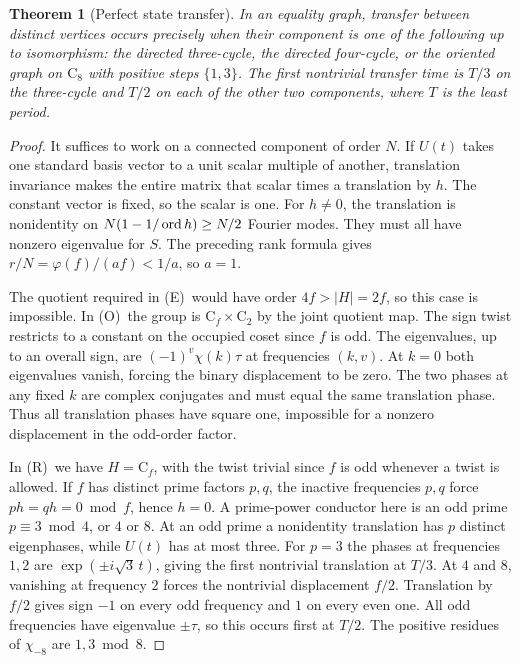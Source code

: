 \documentclass[11pt,letterpaper]{article}
\newtheorem{theorem}{Theorem}[section]
\newcommand{\Cyc}{\mathrm C}
\newcommand{\rr}{\textup{(R)}}\newcommand{\ooe}{\textup{(O)}}\newcommand{\ee}{\textup{(E)}}
\begin{document}
\begin{theorem}[Perfect state transfer]\label{th:pst}
In an equality graph, transfer between distinct vertices occurs precisely when their component is one of the following up to isomorphism: the directed three-cycle, the directed four-cycle, or the oriented graph on $\Cyc_8$ with positive steps $\{1,3\}$. The first nontrivial transfer time is $T/3$ on the three-cycle and $T/2$ on each of the other two components, where $T$ is the least period.
\end{theorem}
\begin{proof}
It suffices to work on a connected component of order $N$. If $U(t)$ takes one standard basis vector to a unit scalar multiple of another, translation invariance makes the entire matrix that scalar times a translation by $h$. The constant vector is fixed, so the scalar is one. For $h\ne0$, the translation is nonidentity on $N(1-1/\operatorname{ord} h)\ge N/2$ Fourier modes. They must all have nonzero eigenvalue for $S$. The preceding rank formula gives $r/N=\varphi(f)/(af)<1/a$, so $a=1$.

The quotient required in \ee\ would have order $4f>|H|=2f$, so this case is impossible. In \ooe\ the group is $\Cyc_f\times\Cyc_2$ by the joint quotient map. The sign twist restricts to a constant on the occupied coset since $f$ is odd. The eigenvalues, up to an overall sign, are $(-1)^v\chi(k)\tau$ at frequencies $(k,v)$. At $k=0$ both eigenvalues vanish, forcing the binary displacement to be zero. The two phases at any fixed $k$ are complex conjugates and must equal the same translation phase. Thus all translation phases have square one, impossible for a nonzero displacement in the odd-order factor.

In \rr\ we have $H=\Cyc_f$, with the twist trivial since $f$ is odd whenever a twist is allowed. If $f$ has distinct prime factors $p,q$, the inactive frequencies $p,q$ force $ph=qh=0\bmod f$, hence $h=0$. A prime-power conductor here is an odd prime $p\equiv3\bmod4$, or $4$ or $8$. At an odd prime a nonidentity translation has $p$ distinct eigenphases, while $U(t)$ has at most three. For $p=3$ the phases at frequencies $1,2$ are $\exp(\pm i\sqrt3\,t)$, giving the first nontrivial translation at $T/3$. At $4$ and $8$, vanishing at frequency $2$ forces the nontrivial displacement $f/2$. Translation by $f/2$ gives sign $-1$ on every odd frequency and $1$ on every even one. All odd frequencies have eigenvalue $\pm\tau$, so this occurs first at $T/2$. The positive residues of $\chi_{-8}$ are $1,3\bmod8$.
\end{proof}
\end{document}
